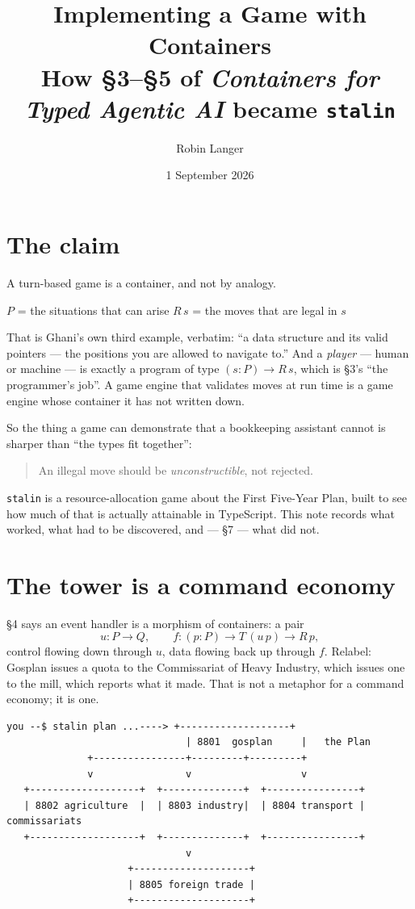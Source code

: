 \documentclass[11pt,a4paper]{article}
\title{\vspace{-2em}Implementing a Game with Containers\\
\large How \S3--\S5 of \emph{Containers for Typed Agentic AI} became \texttt{stalin}}
\author{Robin Langer}
\date{1 September 2026}
\begin{document}
\maketitle

\section{The claim}

A turn-based game is a container, and not by analogy.

\begin{center}
$P$ = the situations that can arise \qquad $R\,s$ = the moves that are legal in $s$
\end{center}

That is Ghani's own third example, verbatim: ``a data structure and its valid
pointers --- the positions you are allowed to navigate to.'' And a
\emph{player} --- human or machine --- is exactly a program of type
$(s : P) \to R\,s$, which is \S3's ``the programmer's job''. A game engine that
validates moves at run time is a game engine whose container it has not
written down.

So the thing a game can demonstrate that a bookkeeping assistant cannot is
sharper than ``the types fit together'':

\begin{quote}
An illegal move should be \emph{unconstructible}, not rejected.
\end{quote}

\texttt{stalin} is a resource-allocation game about the First Five-Year Plan,
built to see how much of that is actually attainable in TypeScript. This note
records what worked, what had to be discovered, and --- \S7 --- what did not.

\section{The tower is a command economy}

\S4 says an event handler is a morphism of containers: a pair
\[
  u : P \to Q, \qquad f : (p : P) \to T\,(u\,p) \to R\,p ,
\]
control flowing down through $u$, data flowing back up through $f$. Relabel:
Gosplan issues a quota to the Commissariat of Heavy Industry, which issues one
to the mill, which reports what it made. That is not a metaphor for a command
economy; it is one.

\begin{lstlisting}[style=trace]
  you --$ stalin plan ...----> +-------------------+
                               | 8801  gosplan     |   the Plan
              +----------------+---------+---------+
              v                v                   v
   +-------------------+  +--------------+  +----------------+
   | 8802 agriculture  |  | 8803 industry|  | 8804 transport |   commissariats
   +-------------------+  +--------------+  +----------------+
                               v
                     +--------------------+
                     | 8805 foreign trade |
                     +--------------------+
\end{lstlisting}
\end{document}
